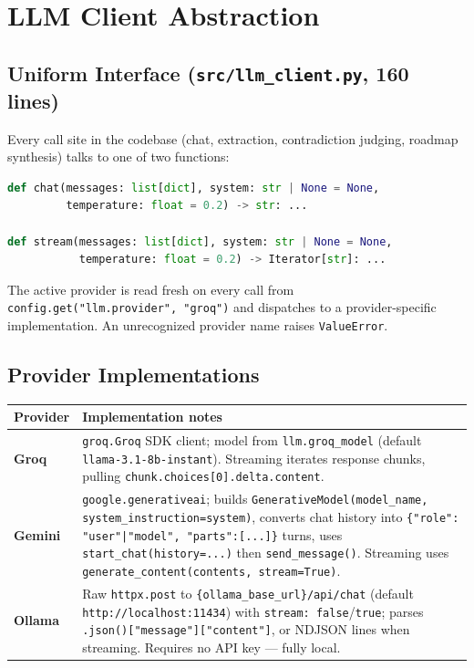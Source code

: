 \documentclass[11pt,a4paper]{report}
\newcommand{\code}[1]{\texttt{\small #1}}
\newcommand{\file}[1]{\texttt{\small\color{accent!70!black}#1}}
\begin{document}
\chapter{LLM Client Abstraction}

\section{Uniform Interface (\file{src/llm\_client.py}, 160 lines)}

Every call site in the codebase (chat, extraction, contradiction judging, roadmap synthesis) talks to one of two functions:

\begin{lstlisting}[language=Python,caption={Public interface}]
def chat(messages: list[dict], system: str | None = None,
         temperature: float = 0.2) -> str: ...

def stream(messages: list[dict], system: str | None = None,
           temperature: float = 0.2) -> Iterator[str]: ...
\end{lstlisting}

The active provider is read fresh on every call from \code{config.get("llm.provider", "groq")} and dispatches to a provider-specific implementation. An unrecognized provider name raises \code{ValueError}.

\section{Provider Implementations}

\begin{longtable}{L{2.2cm}L{10.8cm}}
\toprule
\textbf{Provider} & \textbf{Implementation notes} \\
\midrule
\endhead
\textbf{Groq} & \code{groq.Groq} SDK client; model from \code{llm.groq\_model} (default \code{llama-3.1-8b-instant}). Streaming iterates response chunks, pulling \code{chunk.choices[0].delta.content}. \\
\textbf{Gemini} & \code{google.generativeai}; builds \code{GenerativeModel(model\_name, system\_instruction=system)}, converts chat history into \code{\{"role": "user"|"model", "parts":[...]\}} turns, uses \code{start\_chat(history=...)} then \code{send\_message()}. Streaming uses \code{generate\_content(contents, stream=True)}. \\
\textbf{Ollama} & Raw \code{httpx.post} to \code{\{ollama\_base\_url\}/api/chat} (default \code{http://localhost:11434}) with \code{stream: false}/\code{true}; parses \code{.json()["message"]["content"]}, or NDJSON lines when streaming. Requires no API key — fully local. \\
\bottomrule
\end{longtable}
\end{document}
